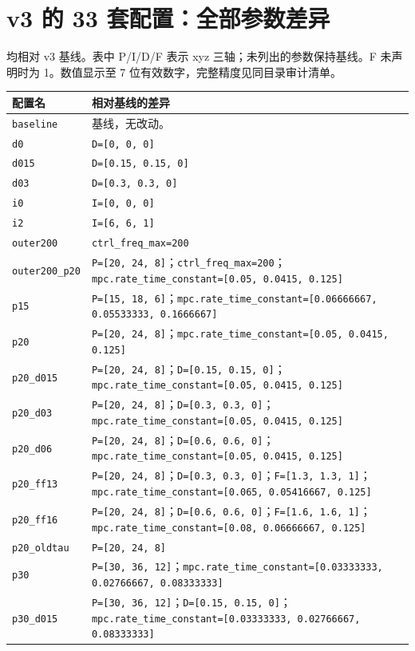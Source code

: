 \documentclass[UTF8,a4paper,11pt,fontset=fandol]{ctexart}
\newcommand{\code}[1]{{\small\nolinkurl{#1}}}
\begin{document}
\appendix
\section{v3 的 33 套配置：全部参数差异}
均相对 v3 基线。表中 P/I/D/F 表示 xyz 三轴；未列出的参数保持基线。F 未声明时为 1。数值显示至 7 位有效数字，完整精度见同目录审计清单。
{\footnotesize\begin{longtable}{L{3.3cm}L{11.9cm}}
\toprule 配置名 & 相对基线的差异\\\midrule\endhead
\code{baseline} & 基线，无改动。\\
\code{d0} & \code{D=[0, 0, 0]}\\
\code{d015} & \code{D=[0.15, 0.15, 0]}\\
\code{d03} & \code{D=[0.3, 0.3, 0]}\\
\code{i0} & \code{I=[0, 0, 0]}\\
\code{i2} & \code{I=[6, 6, 1]}\\
\code{outer200} & \code{ctrl_freq_max=200}\\
\code{outer200_p20} & \code{P=[20, 24, 8]}；\code{ctrl_freq_max=200}；\code{mpc.rate_time_constant=[0.05, 0.0415, 0.125]}\\
\code{p15} & \code{P=[15, 18, 6]}；\code{mpc.rate_time_constant=[0.06666667, 0.05533333, 0.1666667]}\\
\code{p20} & \code{P=[20, 24, 8]}；\code{mpc.rate_time_constant=[0.05, 0.0415, 0.125]}\\
\code{p20_d015} & \code{P=[20, 24, 8]}；\code{D=[0.15, 0.15, 0]}；\code{mpc.rate_time_constant=[0.05, 0.0415, 0.125]}\\
\code{p20_d03} & \code{P=[20, 24, 8]}；\code{D=[0.3, 0.3, 0]}；\code{mpc.rate_time_constant=[0.05, 0.0415, 0.125]}\\
\code{p20_d06} & \code{P=[20, 24, 8]}；\code{D=[0.6, 0.6, 0]}；\code{mpc.rate_time_constant=[0.05, 0.0415, 0.125]}\\
\code{p20_ff13} & \code{P=[20, 24, 8]}；\code{D=[0.3, 0.3, 0]}；\code{F=[1.3, 1.3, 1]}；\code{mpc.rate_time_constant=[0.065, 0.05416667, 0.125]}\\
\code{p20_ff16} & \code{P=[20, 24, 8]}；\code{D=[0.6, 0.6, 0]}；\code{F=[1.6, 1.6, 1]}；\code{mpc.rate_time_constant=[0.08, 0.06666667, 0.125]}\\
\code{p20_oldtau} & \code{P=[20, 24, 8]}\\
\code{p30} & \code{P=[30, 36, 12]}；\code{mpc.rate_time_constant=[0.03333333, 0.02766667, 0.08333333]}\\
\code{p30_d015} & \code{P=[30, 36, 12]}；\code{D=[0.15, 0.15, 0]}；\code{mpc.rate_time_constant=[0.03333333, 0.02766667, 0.08333333]}\\

\end{longtable}}
\end{document}
